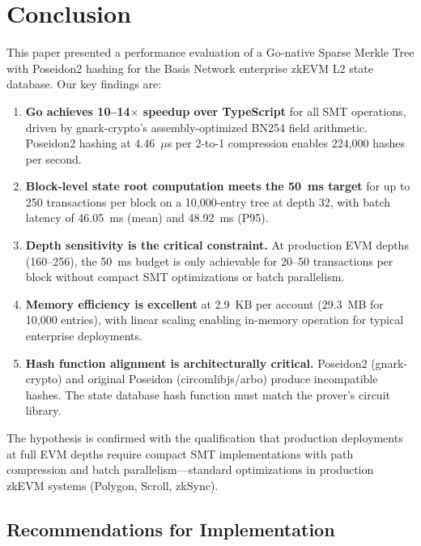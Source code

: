 \section{Conclusion}
\label{sec:conclusion}

This paper presented a performance evaluation of a Go-native Sparse
Merkle Tree with Poseidon2 hashing for the Basis Network enterprise
zkEVM L2 state database. Our key findings are:

\begin{enumerate}
  \item \textbf{Go achieves 10--14$\times$ speedup over TypeScript}
    for all SMT operations, driven by gnark-crypto's
    assembly-optimized BN254 field arithmetic. Poseidon2 hashing at
    4.46~$\mu$s per 2-to-1 compression enables 224,000 hashes per
    second.

  \item \textbf{Block-level state root computation meets the 50~ms
    target} for up to 250 transactions per block on a 10,000-entry
    tree at depth 32, with batch latency of 46.05~ms (mean) and
    48.92~ms (P95).

  \item \textbf{Depth sensitivity is the critical constraint.}
    At production EVM depths (160--256), the 50~ms budget is only
    achievable for 20--50 transactions per block without compact
    SMT optimizations or batch parallelism.

  \item \textbf{Memory efficiency is excellent} at 2.9~KB per
    account (29.3~MB for 10,000 entries), with linear scaling
    enabling in-memory operation for typical enterprise deployments.

  \item \textbf{Hash function alignment is architecturally critical.}
    Poseidon2 (gnark-crypto) and original Poseidon (circomlibjs/arbo)
    produce incompatible hashes. The state database hash function
    must match the prover's circuit library.
\end{enumerate}

The hypothesis is confirmed with the qualification that production
deployments at full EVM depths require compact SMT implementations
with path compression and batch parallelism---standard optimizations
in production zkEVM systems (Polygon, Scroll, zkSync).

\subsection{Recommendations for Implementation}

